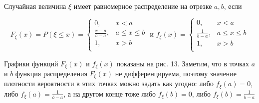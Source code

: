 \begin{definition}
Случайная величина $\xi$ имеет равномерное распределение на отрезке $a, b$, если

\begin{equation}
	F_{\xi}(x) = P(\xi \leq x) = 
	\left\{
	\begin{aligned}
		0, & x<a\\
		\frac{x-a}{b-a}, & a \leq x \leq b\\
		1, & x>b\\
	\end{aligned}
	\right. \text{ и } f_{\xi}(x) = 
	\left\{
	\begin{aligned}
		0, & x<a\\
		\frac{1}{b-a}, & a \leq x \leq b\\
		1, & x>b\\
	\end{aligned}
\end{equation}

Графики функций $F_{\xi}(x)$ и $f_{\xi}(x)$ показаны на рис. 13. Заметим, что в точках $a$ и $b$ функция распределения $F_{\xi}(x)$ не дифференцируема, поэтому значение плотности вероятности в этих точках можно задать как угодно: либо $f_{\xi}(a) = 0$, либо $f_{\xi}(a) = \frac{1}{b-a}$, а на другом конце тоже либо $f_{\xi}(b) = 0$, либо $f_{\xi}(b) = \frac{1}{b-a}$
\end{definition}
	
